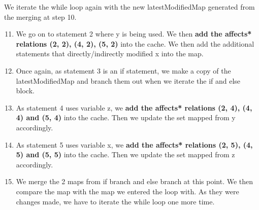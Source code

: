 \documentclass[12pt]{article}
\begin{document}
{{{{{{{{{{{{{{\begin{center}
\begin{minipage}{15em}
\begin{flushleft}
\end{flushleft}
\end{minipage}
\hspace{20mm}
\begin{minipage}{20em}
\normalsize
We iterate the while loop again with the new latestModifiedMap generated from the merging at step 10.
\begin{enumerate}
 \setcounter{enumi}{10}
\item We go on to statement 2 where y is being used. We then \textbf{add the affects* relations (2, 2), (4, 2), (5, 2)} into the cache. We then add the additional statements that directly/indirectly modified x into the map.
\item Once again, as statement 3 is an if statement, we make a copy of the latestModifiedMap and branch them out when we iterate the if and else block.
\item As statement 4 uses variable z, we \textbf{add the affects* relations (2, 4), (4, 4) and (5, 4)} into the cache. Then we update the set mapped from y accordingly.
\item As statement 5 uses variable x, we \textbf{add the affects* relations (2, 5), (4, 5) and (5, 5)} into the cache. Then we update the set mapped from z accordingly. 
\item We merge the 2 maps from if branch and else branch at this point. We then compare the map with the map we entered the loop with. As they were changes made, we have to iterate the while loop one more time.
\end{enumerate}
\end{minipage}
\end{center}
\normalsize


}}}}}}}}}}}}}}
\end{document}
